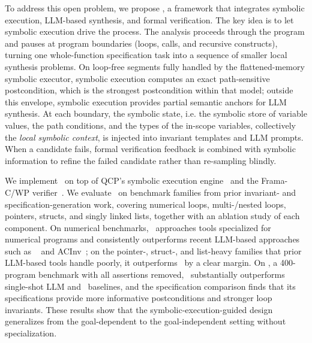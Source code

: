To address this open problem, we propose \toolname, a framework that integrates symbolic execution, LLM-based synthesis, and formal verification. The key idea is to let symbolic execution drive the process. The analysis proceeds through the program and pauses at program boundaries (loops, calls, and recursive constructs), turning one whole-function specification task into a sequence of smaller local synthesis problems. On loop-free segments fully handled by the flattened-memory symbolic executor, symbolic execution computes an exact path-sensitive postcondition, which is the strongest postcondition within that model; outside this envelope, symbolic execution provides partial semantic anchors for LLM synthesis. At each boundary, the symbolic state, i.e. the symbolic store of variable values, the path conditions, and the types of the in-scope variables, collectively the \emph{local symbolic context}, is injected into invariant templates and LLM prompts. When a candidate fails, formal verification feedback is combined with symbolic information to refine the failed candidate rather than re-sampling blindly.

We implement \toolname\ on top of QCP's symbolic execution engine~\cite{vst-a,wu2025qcppracticalseparationlogicbased} and the Frama-C/WP verifier~\cite{cuoq2012frama}.
We evaluate \toolname\ on benchmark families from prior invariant- and specification-generation work, covering numerical loops, multi-/nested loops, pointers, structs, and singly linked lists, together with an ablation study of each component. On numerical benchmarks, \toolname\ approaches tools specialized for numerical programs and consistently outperforms recent LLM-based approaches such as \autospec~\cite{autospec} and ACInv~\cite{Enhancing_Automated_Loop_Invariant_Generation_for_Complex_Programs_with_Large_Language_Models}; on the pointer-, struct-, and list-heavy families that prior LLM-based tools handle poorly, it outperforms \autospec\ by a clear margin. On \textbf{}, a 400-program benchmark with all assertions removed, \toolname\ substantially outperforms single-shot LLM and \autospec\ baselines, and the specification
comparison finds that its specifications provide more informative postconditions and stronger loop invariants. These results show that the symbolic-execution-guided design generalizes from the goal-dependent to the goal-independent setting without specialization.

